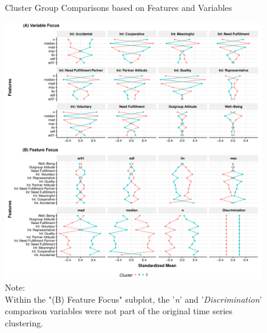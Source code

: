 \begin{figure}[!ht] %
  \caption{Cluster Group Comparisons based on Features and Variables}
  \label{fig:clusterFeatVar}
  \centering\includegraphics[width=\textwidth]{figures/clusterFeatVarComb.pdf}
  \caption*{Note: \\
  Within the "(B) Feature Focus" subplot, the '\textit{n}' and '\textit{Discrimination}' comparison variables were not part of the original time series clustering.}
\end{figure}

